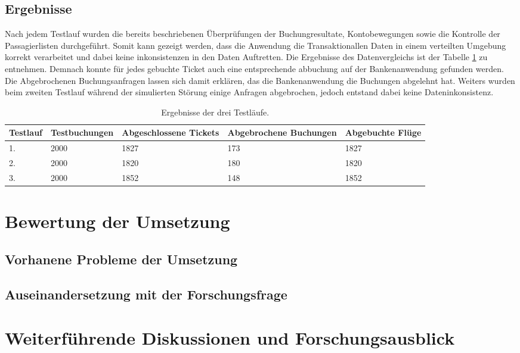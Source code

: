 \subsection{Ergebnisse}
Nach jedem Testlauf wurden die bereits beschriebenen Überprüfungen der Buchungresultate, Kontobewegungen sowie die Kontrolle der Passagierlisten durchgeführt. Somit kann gezeigt werden, dass die Anwendung die Transaktionallen Daten in einem verteilten Umgebung korrekt verarbeitet und dabei keine inkonsistenzen in den Daten Auftretten. Die Ergebnisse des Datenvergleichs ist der Tabelle \ref{tab:evaluation:resultsTestRuns} zu entnehmen. Demnach konnte für jedes gebuchte Ticket auch eine entsprechende abbuchung auf der Bankenanwendung gefunden werden. Die Abgebrochenen Buchungsanfragen lassen sich damit erklären, das die Bankenanwendung die Buchungen abgelehnt hat. Weiters wurden beim zweiten Testlauf während der simulierten Störung einige Anfragen abgebrochen, jedoch entstand dabei keine Dateninkonsistenz.
\begin{table}
    \centering
    \begin{tabular}{p{2 cm} p{2.5 cm} p{2.5 cm} p{2.5 cm} p{2.5 cm}}
        Testlauf    & Testbuchungen       &   Abgeschlossene Tickets & Abgebrochene Buchungen & Abgebuchte Flüge  \\ \hline
            1.      & 2000                &         1827             &      173               &         1827        \\
            2.      & 2000                &         1820             &      180               &         1820        \\
            3.      & 2000                &         1852             &      148               &         1852        
    \end{tabular}
    \caption{Ergebnisse der drei Testläufe.}
    \label{tab:evaluation:resultsTestRuns}
\end{table}

\section{Bewertung der Umsetzung}
\label{cha:rating}

\subsection{Vorhanene Probleme der Umsetzung}

\subsection{Auseinandersetzung mit der Forschungsfrage}

\section{Weiterführende Diskussionen und Forschungsausblick}
 
